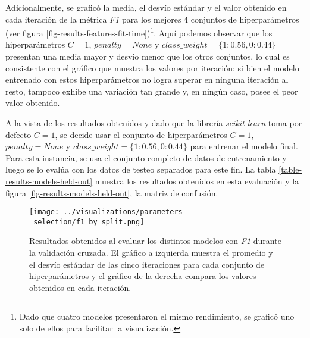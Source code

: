 Adicionalmente, se grafic\'o la media, el desv\'io est\'andar y el valor
obtenido en cada iteraci\'on de la m\'etrica \textit{F1}
para los mejores 4 conjuntos de hiperpar\'ametros
(ver figura \ref{fig-results-features-fit-time})\footnote{Dado
que cuatro modelos presentaron el mismo rendimiento, se grafic\'o uno solo
de ellos para facilitar la visualizaci\'on.}.
Aqu\'i podemos observar que los hiperpar\'ametros $C=1$, $penalty=None$
y $class\_weight=\lbrace1:0.56,0:0.44\rbrace$
presentan una media mayor y desv\'io menor que los otros
conjuntos, lo cual es consistente con el gr\'afico que muestra
los valores por iteraci\'on: si bien el modelo entrenado con estos hiperpar\'ametros
no logra superar en ninguna iteraci\'on al resto, tampoco exhibe
una variaci\'on tan grande y, en ning\'un caso, posee el peor valor
obtenido.
\par
A la vista de los resultados obtenidos y dado que la librería \textit{scikit-learn} toma
por defecto $C=1$, se decide usar el conjunto de hiperparámetros
$C=1$, $penalty=None$ y $class\_weight=\lbrace1:0.56,0:0.44\rbrace$
para entrenar el modelo final.
Para esta instancia, se usa el conjunto completo de datos de entrenamiento y luego
se lo eval\'ua con los datos de testeo separados para este fin. La tabla
\ref{table-results-models-held-out} muestra los resultados obtenidos en
esta evaluaci\'on y la figura \ref{fig-results-models-held-out}, la matriz
de confusi\'on.

\begin{figure}[h!]
    \centering
    \texttt{[image: ../visualizations/parameters\\\_selection/f1\_by\_split.png]}
    \caption{Resultados obtenidos al evaluar los distintos modelos con
    \textit{F1} durante la validaci\'on cruzada. El gr\'afico a izquierda muestra el
    promedio y el desv\'io est\'andar de las cinco iteraciones para cada conjunto
    de hiperpar\'ametros y el gr\'afico de la derecha compara los valores obtenidos en
    cada iteraci\'on.}
    \label{fig-results-models-f1}
\end{figure}

